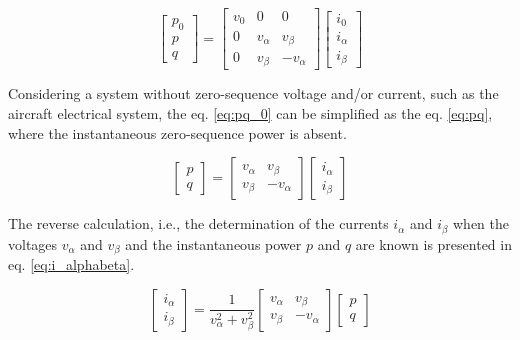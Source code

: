 \begin{equation}
\begin{bmatrix}
p_0\\
p\\
q
\end{bmatrix}=
\begin{bmatrix}
v_0		&	0			&	0\\
0		&	v_{\alpha}	&	v_{\beta}\\
0		&	v_{\beta}	&	-v_{\alpha}
\end{bmatrix}
\begin{bmatrix}
i_{0}\\
i_{\alpha}\\
i_{\beta}
\end{bmatrix}
\label{eq:pq_0}
\end{equation} 

Considering a system without zero-sequence voltage and/or current, such as the aircraft electrical system, the eq. \ref{eq:pq_0} can be simplified as the eq. \ref{eq:pq}, where the instantaneous zero-sequence power is absent.

\begin{equation}
\begin{bmatrix}
p\\
q
\end{bmatrix}=
\begin{bmatrix}
v_{\alpha}	&	v_{\beta}\\
v_{\beta}	&	-v_{\alpha}
\end{bmatrix}
\begin{bmatrix}
i_{\alpha}\\
i_{\beta}
\end{bmatrix}
\label{eq:pq}
\end{equation} 

The reverse calculation, i.e., the determination of the currents $i_{\alpha}$ and $i_{\beta}$ when the voltages $v_{\alpha}$ and $v_{\beta}$ and the instantaneous power $p$ and $q$ are known is presented in eq. \ref{eq:i_alphabeta}.

\begin{equation}
\begin{bmatrix}
i_{\alpha}\\
i_{\beta}
\end{bmatrix}=
\dfrac{1}{v_{\alpha}^2+v_{\beta}^2}
\begin{bmatrix}
v_{\alpha}	&	v_{\beta}\\
v_{\beta}	&	-v_{\alpha}
\end{bmatrix}
\begin{bmatrix}
p\\
q
\end{bmatrix}
\label{eq:i_alphabeta}
\end{equation}

